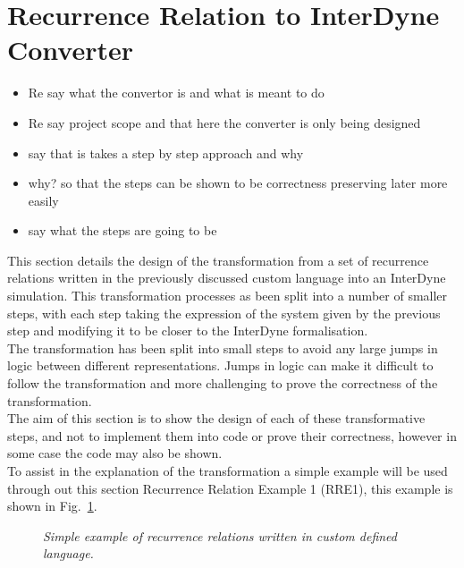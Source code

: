 \documentclass{article}
\begin{document}
\section{Recurrence Relation to InterDyne Converter} 

\begin{itemize}
  \item Re say what the convertor is and what is meant to do
  \item Re say project scope and that here the converter is only being designed 
  \item say that is takes a step by step approach and why 
  \item why? so that the steps can be shown to be correctness preserving later more easily 
  \item say what the steps are going to be 
\end{itemize}






This section details the design of the transformation from a set of recurrence relations written in the previously discussed custom language into an InterDyne simulation. This transformation processes  as been split into a number of smaller steps, with each step taking the expression of the system given by the previous step and modifying it to be closer to the InterDyne formalisation.\\
The transformation has been split into small steps to avoid any large jumps in logic between different representations. Jumps in logic can make it difficult to follow the transformation and more challenging to prove the correctness of the transformation.\\
The aim of this section is to show the design of each of these transformative steps, and not to implement them into code or prove their correctness, however in some case the code may also be shown.\\
To assist in the explanation of the transformation a simple example will be used through out this section Recurrence Relation Example 1 (RRE1), this example is shown in Fig.~\ref{fig:rre1}. 
\begin{figure}[H]
	\centering
	
	\caption{\it Simple example of recurrence relations written in custom defined language.}
	\label{fig:rre1}
\end{figure} 
\end{document}
